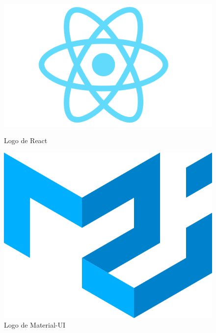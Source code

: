 \begin{figure}[H]
    \centering
    \begin{minipage}{0.3\textwidth}
        \centering
        \includegraphics[width=\textwidth]{figures/7-Construccion/React.png}
        \caption{Logo de React}
    \end{minipage}
    \hspace{0.05\textwidth}
    \begin{minipage}{0.3\textwidth}
        \centering
        \includegraphics[width=\textwidth]{figures/7-Construccion/MaterialUI.png}
        \caption{Logo de Material-UI}
    \end{minipage}
\end{figure}


